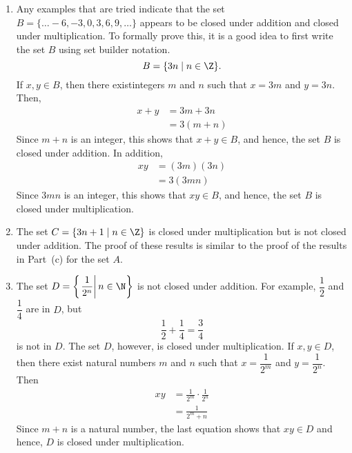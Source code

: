 \begin{enumerate}
\begin{enumerate}
\item Any examples that are tried indicate that the set $B = \{ \ldots -6, -3, 0, 3, 6, 9, \ldots \}$ appears to be closed under addition and closed under multiplication. To formally prove this, it is a good idea to
first write the set $B$ using set builder notation.
\[
B = \{ 3n \mid n \in \Z \}.
\]
If $x, y \in B$, then there existintegers $m$ and $n$ such that $x = 3m$ and $y = 3n$. Then,
\begin{align*}
x + y &= 3m + 3n \\
      &= 3(m + n)
\end{align*}
Since $m + n$ is an integer, this shows that $x + y \in B$, and hence, the set $B$ is closed under addition.
In addition,
\begin{align*}
x y &= (3m)(3n) \\
      &= 3(3mn)
\end{align*}
Since $3mn$ is an integer, this shows that $x y \in B$, and hence, the set $B$ is closed under multiplication.

\item The set $C = \{3n + 1 \mid n \in \Z \}$ is closed under multiplication but is not closed under addition. The proof of these results is similar to the proof of the results in Part~(c) for the set $A$.

\item The set $D = \left\{ \left. \dfrac{1}{2^n} \right| n \in \N \right\}$ is not closed under addition. For example, $\dfrac{1}{2}$ and $\dfrac{1}{4}$ are in $D$, but
\[
\frac{1}{2} + \frac{1}{4} = \frac{3}{4}
\]
is not in $D$. The set $D$, however, is closed under multiplication. If $x, y \in D$, then there exist
natural numbers $m$ and $n$ such that $x = \dfrac{1}{2^m}$ and $y = \dfrac{1}{2^n}$.  Then
\begin{align*}
xy &= \frac{1}{2^m} \cdot \frac{1}{2^n} \\
   &= \frac{1}{2^m + n}
\end{align*}
Since $m + n$ is a natural number, the last equation shows that $xy \in D$ and hence, $D$ is closed under
multiplication.
\end{enumerate}



\end{enumerate}
